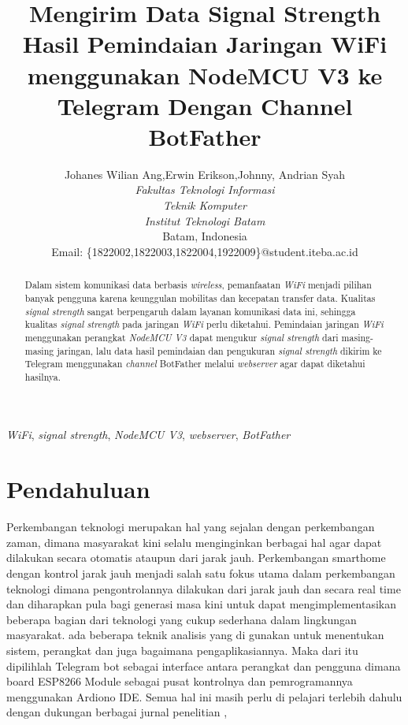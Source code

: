 \documentclass[conference]{IEEEtran}
\title{Mengirim Data Signal Strength Hasil Pemindaian Jaringan WiFi menggunakan NodeMCU V3 ke Telegram Dengan Channel BotFather}
\author{Johanes Wilian Ang\IEEEauthorrefmark{1},Erwin Erikson\IEEEauthorrefmark{2},Johnny\IEEEauthorrefmark{3}, Andrian Syah\IEEEauthorrefmark{4}\\
\textit{Fakultas Teknologi Informasi}\\
\textit{Teknik Komputer}\\
\textit{Institut Teknologi Batam}\\
Batam, Indonesia\\
Email: \{\IEEEauthorrefmark{1}1822002,\IEEEauthorrefmark{2}1822003,\IEEEauthorrefmark{3}1822004,\IEEEauthorrefmark{4}1922009\}@student.iteba.ac.id}
\begin{document}
\maketitle
\begin{abstract}
    Dalam sistem komunikasi data berbasis \emph{wireless}, pemanfaatan \emph{WiFi} 
    menjadi pilihan banyak pengguna karena keunggulan mobilitas dan kecepatan transfer data.
    Kualitas \emph{signal strength} sangat berpengaruh dalam layanan komunikasi data ini, 
    sehingga kualitas \emph{signal strength} pada jaringan \emph{WiFi} perlu diketahui.
    Pemindaian jaringan \emph{WiFi} menggunakan perangkat \emph{NodeMCU V3} dapat mengukur \emph{signal strength} dari 
    masing-masing jaringan, lalu data hasil pemindaian dan pengukuran \emph{signal strength} dikirim ke
    Telegram menggunakan \emph{channel} BotFather melalui \emph{webserver} agar dapat diketahui hasilnya.
\end{abstract}
\vspace{0.2cm}
\begin{IEEEkeywords}
    \emph{WiFi}, \emph{signal strength}, \emph{NodeMCU V3}, \emph{webserver}, \emph{BotFather}
\end{IEEEkeywords}
\section{Pendahuluan}
Perkembangan teknologi merupakan hal yang sejalan dengan 
perkembangan zaman, dimana masyarakat kini selalu
menginginkan berbagai hal agar dapat dilakukan secara otomatis
ataupun dari jarak jauh. Perkembangan smarthome dengan
kontrol jarak jauh menjadi salah satu fokus utama dalam
perkembangan teknologi dimana pengontrolannya dilakukan dari
jarak jauh dan secara real time dan diharapkan pula bagi generasi
masa kini untuk dapat mengimplementasikan beberapa bagian
dari teknologi yang cukup sederhana dalam lingkungan masyarakat. ada
beberapa teknik analisis yang di gunakan untuk menentukan
sistem, perangkat dan juga bagaimana pengaplikasiannya. Maka
dari itu dipilihlah Telegram bot sebagai interface antara perangkat
dan pengguna dimana board ESP8266 Module sebagai pusat
kontrolnya dan pemrogramannya menggunakan Ardiono IDE.
Semua hal ini masih perlu di pelajari terlebih dahulu dengan
dukungan berbagai jurnal penelitian ,
    
\end{document}

